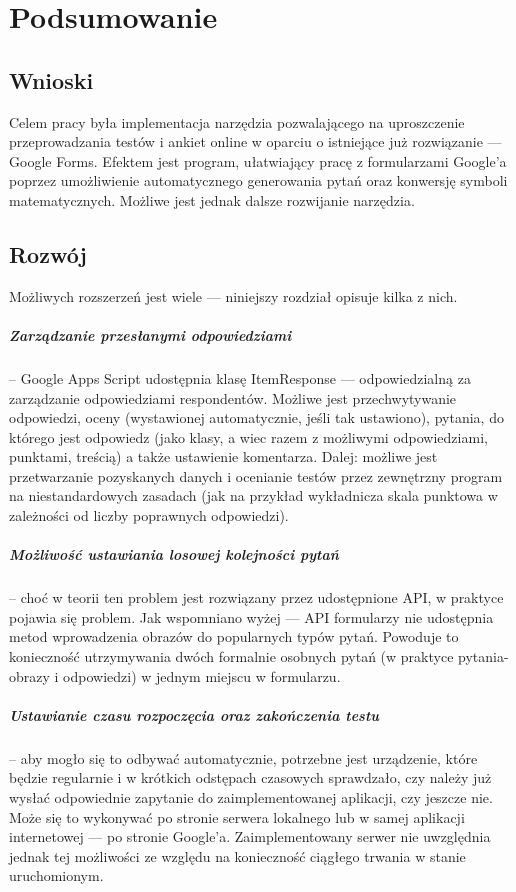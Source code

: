 \chapter{Podsumowanie}%

\section{Wnioski}
Celem pracy była implementacja narzędzia pozwalającego na uproszczenie przeprowadzania testów i ankiet online w oparciu o istniejące już rozwiązanie --- Google Forms.  Efektem jest program, ułatwiający pracę z formularzami Google'a poprzez umożliwienie automatycznego generowania pytań oraz konwersję symboli matematycznych.  Możliwe jest jednak dalsze rozwijanie narzędzia. 

\section{Rozwój}
Możliwych rozszerzeń jest wiele --- niniejszy rozdział opisuje kilka z nich.
\paragraph{Zarządzanie przesłanymi odpowiedziami} -- Google Apps Script udostępnia klasę ItemResponse --- odpowiedzialną za zarządzanie odpowiedziami respondentów. Możliwe jest przechwytywanie odpowiedzi, oceny (wystawionej automatycznie, jeśli tak ustawiono), pytania, do którego jest odpowiedz (jako klasy, a wiec razem z możliwymi odpowiedziami, punktami, treścią) a także ustawienie komentarza. Dalej: możliwe jest przetwarzanie pozyskanych danych i ocenianie testów przez zewnętrzny program na niestandardowych zasadach (jak na przykład wykładnicza skala punktowa w zależności od liczby poprawnych odpowiedzi).
\paragraph{Możliwość ustawiania losowej kolejności pytań} -- choć w teorii ten problem jest rozwiązany przez udostępnione API, w praktyce pojawia się problem. Jak wspomniano wyżej --- API formularzy nie udostępnia metod wprowadzenia obrazów do popularnych typów pytań. Powoduje to konieczność utrzymywania dwóch formalnie osobnych pytań (w praktyce pytania-obrazy i odpowiedzi) w jednym miejscu w formularzu.
\paragraph{Ustawianie czasu rozpoczęcia oraz zakończenia testu} -- aby mogło się to odbywać automatycznie, potrzebne jest urządzenie, które będzie regularnie i w krótkich odstępach czasowych sprawdzało, czy należy już wysłać odpowiednie zapytanie do zaimplementowanej aplikacji, czy jeszcze nie. Może się to wykonywać po stronie serwera lokalnego lub w samej aplikacji internetowej --- po stronie Google'a. Zaimplementowany serwer nie uwzględnia jednak tej możliwości ze względu na konieczność ciągłego trwania w stanie uruchomionym. 


